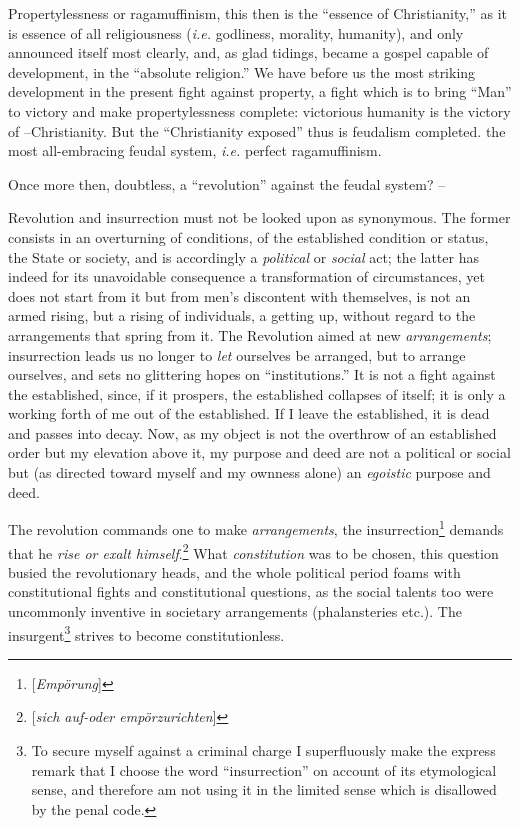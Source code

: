 Propertylessness or ragamuffinism, this then is the ``essence of 
Christianity,'' as it is essence of all religiousness (\textit{i.e.} 
godliness, morality, humanity), and only announced itself most clearly, and, 
as glad tidings, became a gospel capable of development, in the ``absolute 
religion.'' We have before us the most striking development in the present 
fight against property, a fight which is to bring ``Man'' to victory and 
make propertylessness complete: victorious humanity is the victory of 
--Christianity. But the ``Christianity exposed'' thus is feudalism 
completed. the most all-embracing feudal system, \textit{i.e.} perfect 
ragamuffinism.

Once more then, doubtless, a ``revolution'' against the feudal system? --

Revolution and insurrection must not be looked upon as synonymous. The former 
consists in an overturning of conditions, of the established condition or 
status, the State or society, and is accordingly a \textit{political} or 
\textit{social} act; the latter has indeed for its unavoidable consequence a 
transformation of circumstances, yet does not start from it but from men's 
discontent with themselves, is not an armed rising, but a rising of 
individuals, a getting up, without regard to the arrangements that spring from 
it. The Revolution aimed at new \textit{arrangements}; insurrection leads us 
no longer to \textit{let} ourselves be arranged, but to arrange ourselves, and 
sets no glittering hopes on ``institutions.'' It is not a fight against the 
established, since, if it prospers, the established collapses of itself; it is 
only a working forth of me out of the established. If I leave the established, 
it is dead and passes into decay. Now, as my object is not the overthrow of an 
established order but my elevation above it, my purpose and deed are not a 
political or social but (as directed toward myself and my ownness alone) an 
\textit{egoistic} purpose and deed.

The revolution commands one to make \textit{arrangements}, the 
insurrection\footnote{[\textit{Emp\"orung}]} demands that he \textit{rise or 
exalt himself}.\footnote{[\textit{sich auf-oder emp\"orzurichten}]} What 
\textit{constitution} was to be chosen, this question busied the revolutionary 
heads, and the whole political period foams with constitutional fights and 
constitutional questions, as the social talents too were uncommonly inventive 
in societary arrangements (phalansteries etc.). The insurgent\footnote{To 
secure myself against a criminal charge I superfluously make the express 
remark that I choose the word ``insurrection'' on account of its 
etymological sense, and therefore am not using it in the limited sense which 
is disallowed by the penal code.} strives to become constitutionless.

